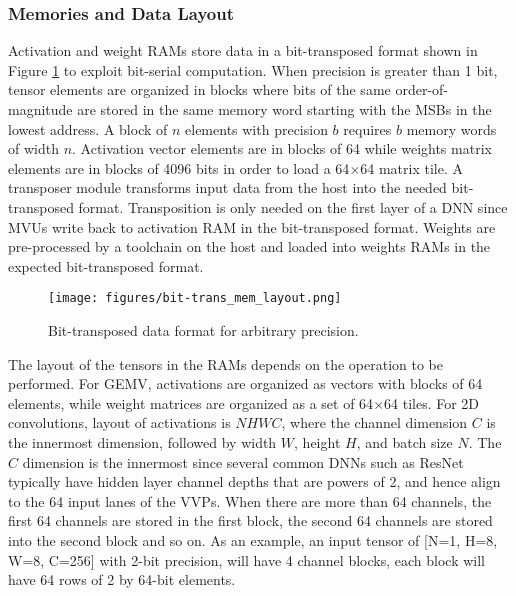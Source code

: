 \documentclass[sigconf]{acmart}
\newcommand{\MVU}{MVU}
\begin{document}
\subsubsection{Memories and Data Layout}\label{memorylayout}
\label{subsec:mem_layout}
Activation and weight RAMs store data in a bit-transposed format shown in Figure \ref{fig:bit-trans_mem_layout} to exploit bit-serial computation. When precision is greater than 1 bit, tensor elements are organized in blocks where bits of the same order-of-magnitude are stored in the same memory word starting with the MSBs in the lowest address. A block of $n$ elements with precision $b$ requires $b$ memory words of width $n$. Activation vector elements are in blocks of 64
while weights matrix elements are in blocks of 4096 bits in order to load a 64$\times$64 matrix tile.
A transposer module transforms input data from the host into the needed bit-transposed format. Transposition is only needed on the first layer of a DNN since \MVU{}s write back to activation RAM in the bit-transposed format. Weights are pre-processed by a toolchain on the host and loaded into weights RAMs in the expected bit-transposed format.

\begin{figure}[!h]
  \centering
    \texttt{[image: figures/bit-trans\_mem\_layout.png]}
    \small
\caption{Bit-transposed data format for arbitrary precision.}
\label{fig:bit-trans_mem_layout}
\vspace{-2mm}
\end{figure}

The layout of the tensors in the RAMs depends on the operation to be performed. For GEMV, activations are organized as vectors with blocks of 64 elements, while weight matrices are organized as a set of 64$\times$64 tiles. For 2D convolutions, layout of activations is $NHWC$, where the channel dimension $C$ is the innermost dimension, followed by width $W$, height $H$, and batch size $N$. The $C$ dimension is the innermost since several common DNNs such as ResNet typically have hidden layer channel depths that are powers of 2, and hence align to the 64 input lanes of the VVPs. When there are more than 64 channels, the first 64 channels are stored in the first block, the second 64 channels are stored into the second block and so on. As an example, an input tensor of [N=1, H=8, W=8, C=256] with 2-bit precision, will have 4 channel blocks, each block will have 64 rows of 2 by 64-bit elements.
\end{document}
